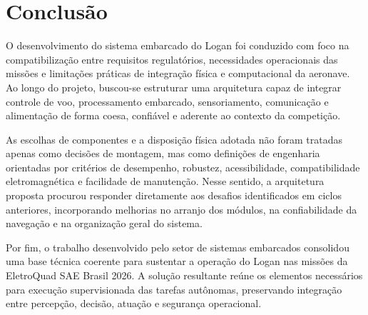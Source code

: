 \section{Conclusão}

O desenvolvimento do sistema embarcado do Logan foi conduzido com foco na compatibilização entre requisitos regulatórios, necessidades operacionais das missões e limitações práticas de integração física e computacional da aeronave. Ao longo do projeto, buscou-se estruturar uma arquitetura capaz de integrar controle de voo, processamento embarcado, sensoriamento, comunicação e alimentação de forma coesa, confiável e aderente ao contexto da competição. 

As escolhas de componentes e a disposição física adotada não foram tratadas apenas como decisões de montagem, mas como definições de engenharia orientadas por critérios de desempenho, robustez, acessibilidade, compatibilidade eletromagnética e facilidade de manutenção. Nesse sentido, a arquitetura proposta procurou responder diretamente aos desafios identificados em ciclos anteriores, incorporando melhorias no arranjo dos módulos, na confiabilidade da navegação e na organização geral do sistema.

Por fim, o trabalho desenvolvido pelo setor de sistemas embarcados consolidou uma base técnica coerente para sustentar a operação do Logan nas missões da EletroQuad SAE Brasil 2026. A solução resultante reúne os elementos necessários para execução supervisionada das tarefas autônomas, preservando integração entre percepção, decisão, atuação e segurança operacional.
